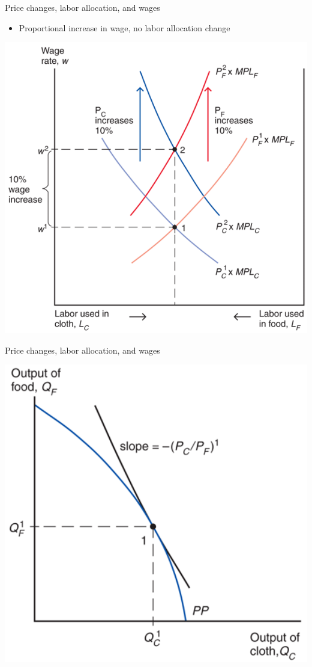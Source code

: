 \documentclass[ignorenonframetext,]{beamer}
\begin{document}
\begin{frame}{Price changes, labor allocation, and wages}
    
    \begin{itemize}
        \item Proportional increase in wage, no labor allocation change 
    \end{itemize}

    \includegraphics[scale=0.22]{prop_price_change.png}

\end{frame}

\begin{frame}{Price changes, labor allocation, and wages}

    \includegraphics[scale=0.25]{ppf_equib.png}

\end{frame}
\end{document}
